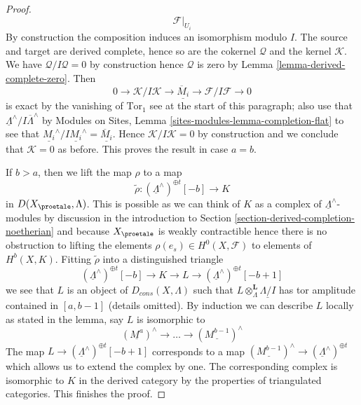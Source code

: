 \begin{proof}
$$\mathcal{F}|_{U_i}
$$
By construction the composition induces an isomorphism modulo $I$.
The source and target are derived complete, hence so are the cokernel
$\mathcal{Q}$ and the kernel $\mathcal{K}$. We have
$\mathcal{Q}/I\mathcal{Q} = 0$ by construction hence $\mathcal{Q}$
is zero by Lemma \ref{lemma-derived-complete-zero}.
Then
$$
0 \to \mathcal{K}/I\mathcal{K} \to
\underline{\overline{M}_i}
\to \mathcal{F}/I\mathcal{F} \to 0
$$
is exact by the vanishing of $\text{Tor}_1$ see at the start of this
paragraph; also use that
$\underline{\Lambda}^\wedge/I\overline{\Lambda}^\wedge$ by
Modules on Sites, Lemma \ref{sites-modules-lemma-completion-flat}
to see that
$\underline{M_i}^\wedge/I\underline{M_i}^\wedge = \underline{\overline{M}_i}$.
Hence $\mathcal{K}/I\mathcal{K} = 0$ by construction and we conclude
that $\mathcal{K} = 0$ as before. This proves the result in case $a = b$.

\medskip\noindent
If $b > a$, then we lift the map $\rho$ to a map
$$
\tilde \rho : (\underline{\Lambda}^\wedge)^{\oplus t}[-b] \longrightarrow K
$$
in $D(X_\proetale, \Lambda)$. This is possible as we can think of
$K$ as a complex of $\underline{\Lambda}^\wedge$-modules by
discussion in the introduction to
Section \ref{section-derived-completion-noetherian}
and because $X_\proetale$ is weakly contractible
hence there is no obstruction to lifting the elements
$\rho(e_s) \in H^0(X, \mathcal{F})$ to elements of $H^b(X, K)$.
Fitting $\tilde \rho$ into a distinguished triangle
$$
(\underline{\Lambda}^\wedge)^{\oplus t}[-b] \to K \to L \to
(\underline{\Lambda}^\wedge)^{\oplus t}[-b + 1]
$$
we see that $L$ is an object of $D_{cons}(X, \Lambda)$ such
that $L \otimes_\Lambda^\mathbf{L} \underline{\Lambda/I}$
has tor amplitude contained in $[a, b - 1]$ (details omitted).
By induction we can describe $L$ locally as stated in the lemma, say
$L$ is isomorphic to
$$
(\underline{M^a})^\wedge \to \ldots \to (\underline{M^{b - 1}})^\wedge
$$
The map
$L \to (\underline{\Lambda}^\wedge)^{\oplus t}[-b + 1]$
corresponds to a map
$(\underline{M^{b - 1}})^\wedge \to (\underline{\Lambda}^\wedge)^{\oplus t}$
which allows us to extend the complex by one. The corresponding
complex is isomorphic to $K$ in the derived category by the properties
of triangulated categories. This finishes the proof.
\end{proof}










